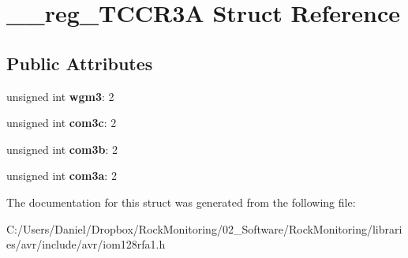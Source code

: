 \hypertarget{struct____reg___t_c_c_r3_a}{}\section{\+\_\+\+\_\+reg\+\_\+\+T\+C\+C\+R3A Struct Reference}
\label{struct____reg___t_c_c_r3_a}
\subsection*{Public Attributes}
\begin{DoxyCompactItemize}
\item 
unsigned int {\bfseries wgm3}\+: 2\hypertarget{struct____reg___t_c_c_r3_a_a61bec0106dd44034a4dbbc9a2e0ee109}{}\label{struct____reg___t_c_c_r3_a_a61bec0106dd44034a4dbbc9a2e0ee109}

\item 
unsigned int {\bfseries com3c}\+: 2\hypertarget{struct____reg___t_c_c_r3_a_a3a2856b3a175f2407046f3a7dd19e018}{}\label{struct____reg___t_c_c_r3_a_a3a2856b3a175f2407046f3a7dd19e018}

\item 
unsigned int {\bfseries com3b}\+: 2\hypertarget{struct____reg___t_c_c_r3_a_a7d6981cc1b271a69bdb7ec59ab7fc1e9}{}\label{struct____reg___t_c_c_r3_a_a7d6981cc1b271a69bdb7ec59ab7fc1e9}

\item 
unsigned int {\bfseries com3a}\+: 2\hypertarget{struct____reg___t_c_c_r3_a_ab9a93c4e1e07caba778ab962964d3374}{}\label{struct____reg___t_c_c_r3_a_ab9a93c4e1e07caba778ab962964d3374}

\end{DoxyCompactItemize}


The documentation for this struct was generated from the following file\+:\begin{DoxyCompactItemize}
\item 
C\+:/\+Users/\+Daniel/\+Dropbox/\+Rock\+Monitoring/02\+\_\+\+Software/\+Rock\+Monitoring/libraries/avr/include/avr/iom128rfa1.\+h\end{DoxyCompactItemize}
